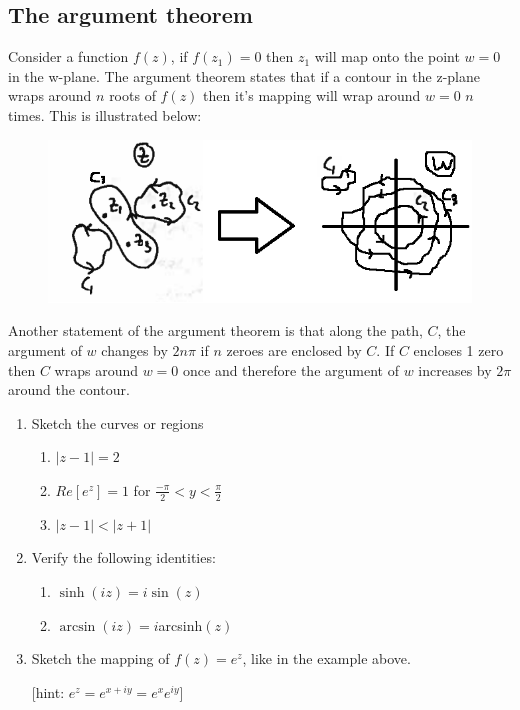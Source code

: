 \subsection{The argument theorem}
Consider a function $f(z)$, if $f(z_1)=0$ then $z_1$ will map onto the point $w=0$ in the w-plane.
 The argument theorem states that if a contour in the z-plane wraps around $n$ roots of $f(z)$ then it's mapping will wrap around $w=0$ $n$ times. 
 This is illustrated below:
\begin{figure}[H]
	\centering
	\includegraphics[width=\linewidth]{complex/argthm}
	\captionsetup{font=small} 	
\end{figure}
\noindent Another statement of the argument theorem is that along the path, $C$, the argument of $w$ changes by $2n\pi$ if $n$ zeroes are enclosed by $C$.
 If $C$ encloses 1 zero then $C$ wraps around $w=0$ once and therefore the argument of $w$ increases by $2\pi$ around the contour.
%
\begin{examples}
	\begin{enumerate}
		\item Sketch the curves or regions
		\begin{enumerate}
			\item $|z-1|=2$
			\item $Re[e^z]=1$ for $\frac{-\pi}{2} < y < \frac{\pi}{2}$
			\item $|z-1|<|z+1|$
		\end{enumerate}
		\item Verify the following identities:
		\begin{enumerate}
			\item $\sinh(iz)=i\sin(z)$
			\item $\arcsin(iz)=i$arcsinh$(z)$
		\end{enumerate}
		\item Sketch the mapping of $f(z)=e^z$, like in the example above.
		
		 [hint: $e^z=e^{x+iy}=e^xe^{iy}$]
	\end{enumerate}
\end{examples}
%
%
%
